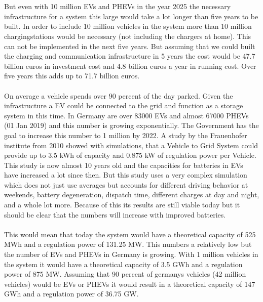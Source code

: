 \begin{parcolumns}[colwidths={1=2.5 cm, 2=10 cm, 3=2.5cm}]{3}
{\\ \\
But even with 10 million EVs and PHEVs in the year 2025 the necessary infrastructure for a system this large would take a lot longer than five years to be built. In order to include 10 million vehicles in the system more than 10 million chargingstations would be necessary (not including the chargers at home). This can not be implemented in the next five years. But assuming that we could built the charging and communication infrastructure in 5 years the cost would be 47.7 billion euros in investment cost and 4.8 billion euros a year in running cost. Over five years this adds up to 71.7 billion euros.
\\ \\
\noindent
On average a vehicle spends over 90 percent of the day parked. Given the infrastructure a EV could be connected to the grid and function as a storage system in this time. In Germany are over 83000 EVs and almost 67000 PHEVs (01 Jan 2019)
and this number is growing exponentially. The Government has the goal to increase this number to 1 million by 2022.
A study by the Frauenhofer institute from 2010 showed with simulations, that a Vehicle to Grid System could provide up to 3.5 kWh of capacity and 0.875 kW of regulation power per Vehicle. This study is now almost 10 years old and the capacities for batteries in EVs have increased a lot since then. But this study uses a very complex simulation which does not just use averages but accounts for different driving behavior at weekends, battery degeneration, dispatch time, different charges at day and night, and a whole lot more. Because of this its results are still viable today but it should be clear that the numbers will increase with improved batteries.
\\ \\
This would mean that today the system would have a theoretical capacity of 525 MWh and a regulation power of 131.25 MW. This numbers a relatively low but the number of EVs and PHEVs in Germany is growing. With 1 million vehicles in the system it would have a theoretical capacity of 3.5 GWh and a regulation power of 875 MW. Assuming that 90 percent of germanys vehicles (42 million vehicles) would be EVs or PHEVs it would result in a theoretical capacity of 147 GWh and a regulation power of 36.75 GW.
}
\end{parcolumns}
